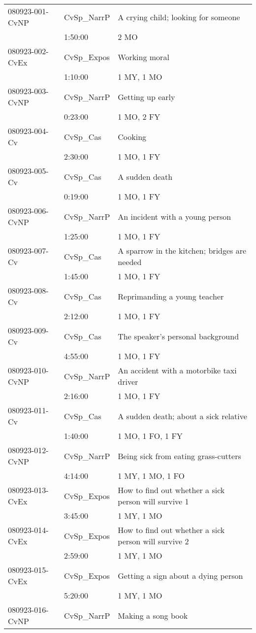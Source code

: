 {\begin{longtable}{p{2.75cm}@{\hspace{1em}}p{2.75cm}@{\hspace{1em}}p{5.75cm}}
080923-001-CvNP & CvSp\_NarrP & A crying child; looking for someone\\
& 1:50:00 & 2 MO\\
080923-002-CvEx & CvSp\_Expos & Working moral\\
& 1:10:00 & 1 MY, 1 MO\\
080923-003-CvNP & CvSp\_NarrP & Getting up early\\
& 0:23:00 & 1 MO, 2 FY\\
080923-004-Cv & CvSp\_Cas & Cooking\\
& 2:30:00 & 1 MO, 1 FY\\
080923-005-Cv & CvSp\_Cas & A sudden death\\
& 0:19:00 & 1 MO, 1 FY\\
080923-006-CvNP & CvSp\_NarrP & An incident with a young person\\
& 1:25:00 & 1 MO, 1 FY\\
080923-007-Cv & CvSp\_Cas & A sparrow in the kitchen; bridges are needed\\
& 1:45:00 & 1 MO, 1 FY\\
080923-008-Cv & CvSp\_Cas & Reprimanding a young teacher\\
& 2:12:00 & 1 MO, 1 FY\\
080923-009-Cv & CvSp\_Cas & The speaker’s personal background\\
& 4:55:00 & 1 MO, 1 FY\\
080923-010-CvNP & CvSp\_NarrP & An accident with a motorbike taxi driver\\
& 2:16:00 & 1 MO, 1 FY\\
080923-011-Cv & CvSp\_Cas & A sudden death; about a sick relative\\
& 1:40:00 & 1 MO, 1 FO, 1 FY\\
080923-012-CvNP & CvSp\_NarrP & Being sick from eating grass-cutters\\
& 4:14:00 & 1 MY, 1 MO, 1 FO\\
080923-013-CvEx & CvSp\_Expos & How to find out whether a sick person will survive 1\\
& 3:45:00 & 1 MY, 1 MO\\
080923-014-CvEx & CvSp\_Expos & How to find out whether a sick person will survive 2\\
& 2:59:00 & 1 MY, 1 MO\\
080923-015-CvEx & CvSp\_Expos & Getting a sign about a dying person\\
& 5:20:00 & 1 MY, 1 MO\\
080923-016-CvNP & CvSp\_NarrP & Making a song book\\

\end{longtable}}
